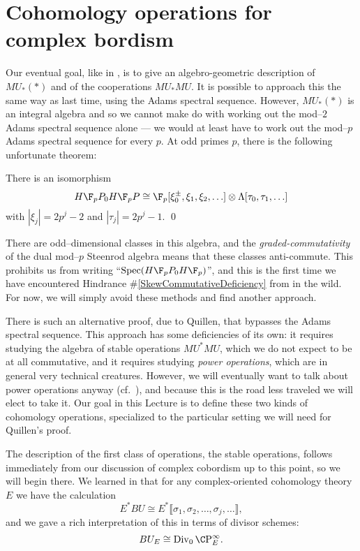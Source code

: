 \section{Cohomology operations for complex bordism}

Our eventual goal, like in , is to give an algebro-geometric description of $MU_*(*)$ and of the cooperations $MU_* MU$.  It is possible to approach this the same way as last time, using the Adams spectral sequence.  However, $MU_*(*)$ is an integral algebra and so we cannot make do with working out the mod--$2$ Adams spectral sequence alone --- we would at least have to work out the mod--$p$ Adams spectral sequence for every $p$.  At odd primes $p$, there is the following unfortunate theorem:
\begin{theorem}
There is an isomorphism
\[H\F_pP_0 H\F_pP \cong \F_p[\xi_0^\pm, \xi_1, \xi_2, \ldots] \otimes \Lambda[\tau_0, \tau_1, \ldots]\]
with $|\xi_j| = 2p^j-2$ and $|\tau_j| = 2p^j - 1$. \qed
\end{theorem}
\noindent There are odd--dimensional classes in this algebra, and the \emph{graded-commutativity} of the dual mod--$p$ Steenrod algebra means that these classes anti-commute.  This prohibits us from writing ``$\Spec(H\F_pP_0 H\F_p)$'', and this is the first time we have encountered Hindrance \#\ref{SkewCommutativeDeficiency} from  in the wild.  For now, we will simply avoid these methods and find another approach.

There is such an alternative proof, due to Quillen, that bypasses the Adams spectral sequence.  This approach has some deficiencies of its own: it requires studying the algebra of stable operations $MU^* MU$, which we do not expect to be at all commutative, and it requires studying \textit{power operations}, which are in general very technical creatures.  However, we will eventually want to talk about power operations anyway (cf.\ ), and because this is the road less traveled we will elect to take it.  Our goal in this Lecture is to define these two kinds of cohomology operations, specialized to the particular setting we will need for Quillen's proof.


The description of the first class of operations, the stable operations, follows immediately from our discussion of complex cobordism up to this point, so we will begin there.  We learned in  that for any complex-oriented cohomology theory $E$ we have the calculation \[E^* BU \cong E^*\llbracket \sigma_1, \sigma_2, \ldots, \sigma_j, \ldots\rrbracket,\] and we gave a rich interpretation of this in terms of divisor schemes: \[BU_E \cong \Div_0 \CP^\infty_E.\]


